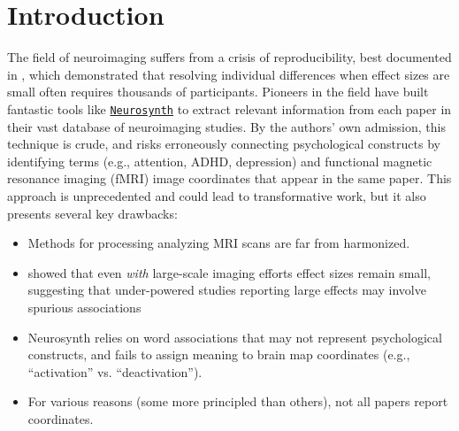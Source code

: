 

\section{Introduction}
\label{sec:papertag.introduction}


The field of neuroimaging suffers from a crisis of reproducibility, best documented in \cite{MarekEtAl2022}, which demonstrated that resolving individual differences when effect sizes are small often requires thousands of participants. Pioneers in the field have built fantastic tools like \href{https://neurosynth.org/}{\texttt{Neurosynth}} \cite{YarkoniEtAl2011} to extract relevant information from each paper in their vast database of neuroimaging studies. By the authors' own admission, this technique is crude, and risks erroneously connecting psychological constructs by identifying terms (e.g., attention, ADHD, depression) and functional magnetic resonance imaging (fMRI) image coordinates that appear in the same paper. This approach is unprecedented and could lead to transformative work, but it also presents several key drawbacks:

\begin{itemize}
	\item Methods for processing analyzing MRI scans are far from harmonized.
	\item \cite{owensRecalibratingExpectationsEffect2021} showed that even \textit{with} large-scale imaging efforts effect sizes remain small, suggesting that under-powered studies reporting large effects may involve spurious associations
	\item Neurosynth relies on word associations that may not represent psychological constructs, and fails to assign meaning to brain map coordinates (e.g., ``activation'' vs. ``deactivation''). 
	\item For various reasons (some more principled than others), not all papers report coordinates.
\end{itemize}

